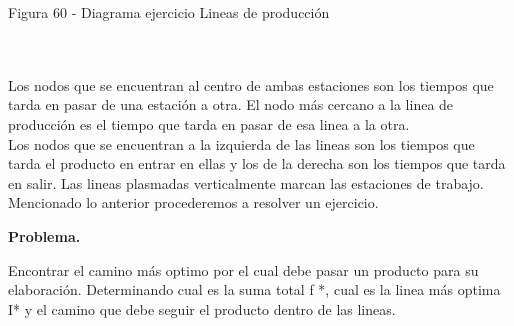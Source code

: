 \documentclass[12pt,twoside]{article}
\begin{document}
\begin{center}
    Figura 60 - Diagrama ejercicio Lineas de producción
\end{center}
\\ \\
Los nodos que se encuentran al centro de ambas estaciones son los tiempos que tarda en pasar de una estación a otra. El nodo más cercano a la linea de producción es el tiempo que tarda en pasar de esa linea a la otra. \\
Los nodos que se encuentran a la izquierda de las lineas son los tiempos que tarda el producto en entrar en ellas y los de la derecha son los tiempos que tarda en salir.
Las lineas plasmadas verticalmente marcan las estaciones de trabajo.
Mencionado lo anterior procederemos a resolver un ejercicio.

\textbf{Problema.}

Encontrar el camino más optimo por el cual debe pasar un producto para su elaboración. Determinando cual es la suma total f *, cual es la linea más optima I* y el camino que debe seguir el producto dentro de las lineas.
\end{document}
